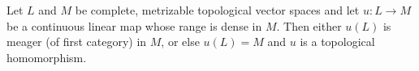 Let $L$ and $M$ be complete, metrizable topological vector spaces and let $u: L \to M$ be a continuous linear map whose range is dense in $M$. Then either $u(L)$ is meager (of first category) in $M$, or else $u(L) = M$ and $u$ is a topological homomorphism.
